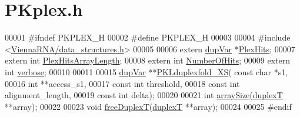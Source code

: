 \hypertarget{_p_kplex_8h_source}{}\section{P\+Kplex.\+h}
\label{_p_kplex_8h_source}

\begin{DoxyCode}
00001 \textcolor{preprocessor}{#ifndef PKPLEX\_H}
00002 \textcolor{preprocessor}{#define PKPLEX\_H}
00003 
00004 \textcolor{preprocessor}{#include <\mbox{\hyperlink{data__structures_8h}{ViennaRNA/data\_structures.h}}>}
00005 
00006 \textcolor{keyword}{extern} \mbox{\hyperlink{group__data__structures_structdup_var}{dupVar}} *\mbox{\hyperlink{_p_kplex_8h_a767aa6aa4f175346e6272e86e55f9300}{PlexHits}};
00007 \textcolor{keyword}{extern} \textcolor{keywordtype}{int}    \mbox{\hyperlink{_p_kplex_8h_a589c8aca648d68facef272eb30566cfe}{PlexHitsArrayLength}};
00008 \textcolor{keyword}{extern} \textcolor{keywordtype}{int}    \mbox{\hyperlink{_p_kplex_8h_add9a2e10879318b2364defaa35676f36}{NumberOfHits}};
00009 \textcolor{keyword}{extern} \textcolor{keywordtype}{int}    \mbox{\hyperlink{_p_kplex_8h_a0b2caeb4b6f130be43e5a2f0267dd453}{verbose}};
00010 
00011 
00015 \mbox{\hyperlink{group__data__structures_structdup_var}{dupVar}}  **\mbox{\hyperlink{_p_kplex_8h_aeee8f0fa1e28dbd38f9672320a8ffaab}{PKLduplexfold\_XS}}( \textcolor{keyword}{const} \textcolor{keywordtype}{char} *s1,
00016                             \textcolor{keywordtype}{int} **access\_s1,
00017                             \textcolor{keyword}{const} \textcolor{keywordtype}{int} threshold,
00018                             \textcolor{keyword}{const} \textcolor{keywordtype}{int} alignment\_length,
00019                             \textcolor{keyword}{const} \textcolor{keywordtype}{int} delta);
00020 
00021 \textcolor{keywordtype}{int}     \mbox{\hyperlink{_p_kplex_8h_ae867a9c0aaca9d6913498f4bbf15d38e}{arraySize}}(\mbox{\hyperlink{group__data__structures_structduplex_t}{duplexT}} **array);
00022 
00023 \textcolor{keywordtype}{void}    \mbox{\hyperlink{_p_kplex_8h_a78997af137c826fb0eedb201bfc6ec4a}{freeDuplexT}}(\mbox{\hyperlink{group__data__structures_structduplex_t}{duplexT}} **array);
00024 
00025 \textcolor{preprocessor}{#endif}
\end{DoxyCode}
